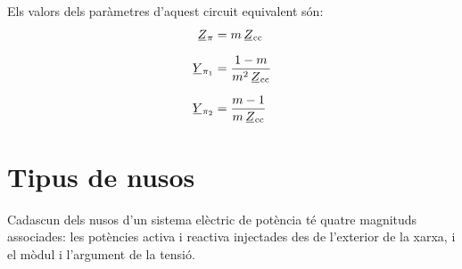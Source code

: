 \begin{center}
    
    \label{pic:equiv_trafo_reg}
\end{center}

Els valors dels paràmetres d'aquest circuit equivalent són:
\begin{align}
   \cmplx{Z}_\pi &= m \, \cmplx{Z}\ped{cc} \\[1.5ex]
   \cmplx{Y}_{\pi_1} &= \frac{1-m}{m^2 \,\cmplx{Z}\ped{cc}} \\[1.5ex]
   \cmplx{Y}_{\pi_2} &= \frac{m-1}{m\, \cmplx{Z}\ped{cc}}
\end{align}

\section{Tipus de nusos} 

Cadascun dels nusos d'un sistema elèctric de potència té quatre
magnituds associades: les potències activa i reactiva injectades des
de l'exterior de la xarxa, i el mòdul i l'argument de la
tensió.

